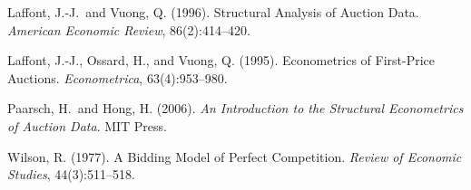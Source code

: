 \documentclass[11pt]{article}
\begin{document}

\noindent Laffont, J.-J.\ and Vuong, Q. (1996). Structural Analysis of Auction Data. \textit{American Economic Review}, 86(2):414--420.

\noindent Laffont, J.-J., Ossard, H., and Vuong, Q. (1995). Econometrics of First-Price Auctions. \textit{Econometrica}, 63(4):953--980.


\noindent Paarsch, H.\ and Hong, H. (2006). \textit{An Introduction to the Structural Econometrics of Auction Data}. MIT Press.

\noindent Wilson, R. (1977). A Bidding Model of Perfect Competition. \textit{Review of Economic Studies}, 44(3):511--518.
\end{document}
